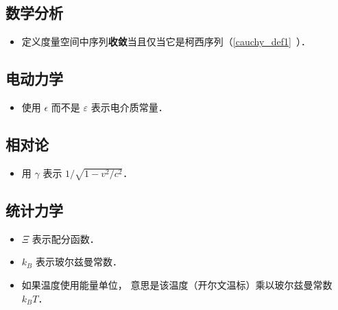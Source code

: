 \subsection{数学分析}
\begin{itemize}
\item 定义度量空间中序列\textbf{收敛}当且仅当它是柯西序列（\autoref{cauchy_def1}~）．
\end{itemize}

\subsection{电动力学}
\begin{itemize}
\item 使用 $\epsilon$ 而不是 $\varepsilon$ 表示电介质常量．
\end{itemize}

\subsection{相对论}
\begin{itemize}
\item 用 $\gamma$ 表示 $1/\sqrt{1 - v^2/c^2}$．
\end{itemize}

\subsection{统计力学}
\begin{itemize}
\item $\Xi$ 表示配分函数．
\item $k_B$ 表示玻尔兹曼常数．
\item 如果温度使用能量单位， 意思是该温度（开尔文温标）乘以玻尔兹曼常数 $k_B T$．
\end{itemize}

